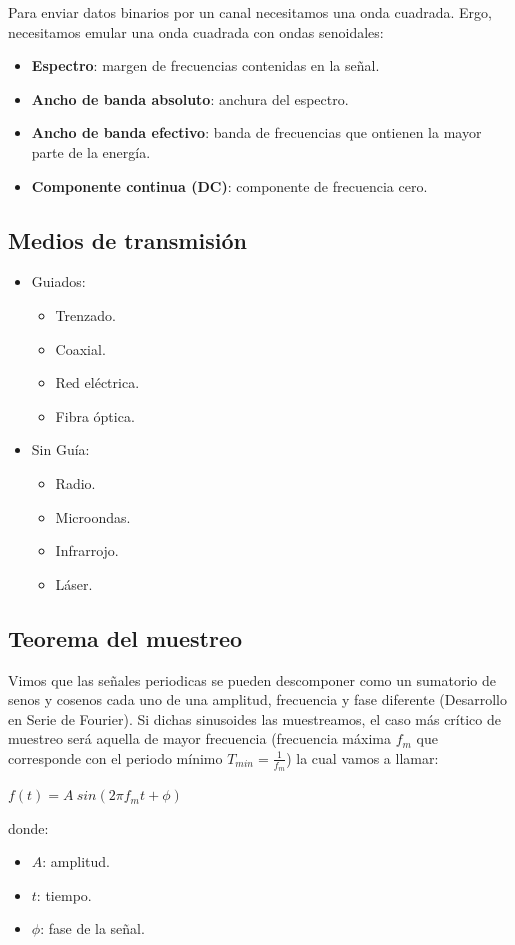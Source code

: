 \documentclass[]{article}
\begin{document}
Para enviar datos binarios por un canal necesitamos una onda cuadrada. Ergo, necesitamos emular una onda cuadrada con ondas senoidales:


\begin{itemize}
    \item \textbf{Espectro}: margen de frecuencias contenidas en la señal.
    \item \textbf{Ancho de banda absoluto}: anchura del espectro.
    \item \textbf{Ancho de banda efectivo}: banda de frecuencias que ontienen la mayor parte de la energía.
    \item \textbf{Componente continua (DC)}: componente de frecuencia cero.
\end{itemize}

\subsection{Medios de transmisión}
\begin{itemize}
    \item Guiados:
    \begin{itemize}
        \item Trenzado.
        \item Coaxial.
        \item Red eléctrica.
        \item Fibra óptica.
    \end{itemize}
    \item Sin Guía:
    \begin{itemize}
        \item Radio.
        \item Microondas.
        \item Infrarrojo.
        \item Láser.
    \end{itemize}
\end{itemize}

\subsection{Teorema del muestreo}
Vimos que las señales periodicas se pueden descomponer como un sumatorio de senos y cosenos cada uno de una amplitud, frecuencia y fase diferente (Desarrollo en Serie de Fourier). Si dichas sinusoides las muestreamos, el caso más crítico de muestreo será aquella de mayor frecuencia (frecuencia máxima $f_m$ que corresponde con el periodo mínimo $T_{min}=\frac{1}{f_m}$) la cual vamos a llamar:
\begin{center}
    $f(t)=A\ sin(2\pi f_m t + \phi)$
\end{center}
donde:
\begin{itemize}
    \item $A$: amplitud.
    \item $t$: tiempo.
    \item $\phi$: fase de la señal.
\end{itemize}
\end{document}
